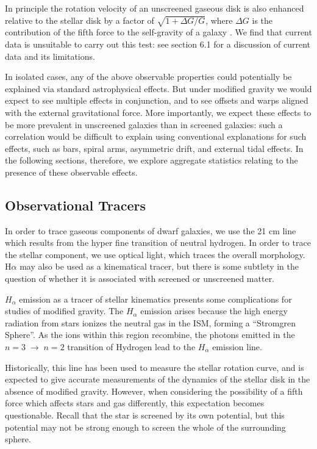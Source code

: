 \documentclass[useAMS,usenatbib,twocolumn]{mn2e}
\newcommand{\ha}{H$\alpha$}
\begin{document}
\begin{enumerate}
In principle the rotation velocity of an unscreened gaseous
disk is also enhanced relative to the stellar disk by a factor of
$\sqrt{1 + \Delta G/G}$, where $\Delta G$ is the contribution of the fifth force
to the self-gravity of a galaxy \citep{hui10}. 
We find that current data
is unsuitable to carry out this test: 
see section 6.1 for a discussion of current data and its limitations. 

\end{enumerate}

In isolated cases,
any of the above observable properties could potentially be explained via
standard astrophysical effects.  But under modified gravity we would expect
to see multiple effects in conjunction, and to see offsets and warps
aligned with the external gravitational force.
More importantly, we expect these effects to be more prevalent
in unscreened galaxies than in screened galaxies: such a correlation
would be difficult to explain using conventional explanations for such effects,
such as bars, spiral arms, asymmetric drift, and external tidal effects.
In the following sections, therefore, we explore aggregate statistics
relating to the presence of these observable effects.  

\subsection{Observational Tracers}
\label{sec:halpha}

In order to trace gaseous components of dwarf galaxies,
we use the 21 cm line which results from the hyper fine transition of
neutral hydrogen.
In order to trace the stellar component, we use
optical light, which traces the overall morphology. 
\ha{} may also be used as a kinematical tracer, but there is
some subtlety in the question of whether it is associated
with screened or unscreened matter.

$H_{\alpha}$ emission as a tracer of stellar kinematics 
presents some complications for
studies of modified gravity. The $H_{\alpha}$ emission arises  because
the high energy radiation from stars ionizes the neutral gas in the ISM,
forming a  ``Stromgren Sphere''.
As the ions within this region recombine,
the photons emitted in the $n=3\;\to\;n=2$ transition
of Hydrogen lead to the $H_{\alpha}$ emission line.

Historically, this line has been
used to measure the stellar rotation curve, and is expected to give accurate
measurements of the dynamics of the stellar disk in the absence of modified
gravity. However, when considering the possibility of a fifth force which
affects stars and gas differently, this expectation becomes questionable.
Recall that the star is screened by its own potential, but this potential
may not be strong enough to screen the whole of the surrounding sphere.
\end{document}

